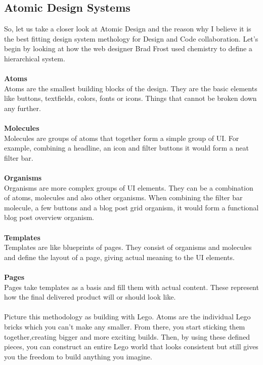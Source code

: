 \newpage
\subsection{Atomic Design Systems} %
So, let us take a closer look at Atomic Design and the reason why I believe it is the best fitting
design system methology for Design and Code collaboration. Let's begin by looking at how the web
designer Brad Frost used chemistry to define a hierarchical system. \\\\
\textbf{Atoms} \\
Atoms are the smallest building blocks of the design. They are the basic elements like buttons,
textfields, colors, fonts or icons. Things that cannot be broken down any further. \\\\
\textbf{Molecules} \\
Molecules are groups of atoms that together form a simple group of UI. For example, combining
a headline, an icon and filter buttons it would form a neat filter bar. \\\\
\textbf{Organisms} \\
Organisms are more complex groups of UI elements. They can be a combination of atoms, molecules and
also other organisms. When combining the filter bar molecule, a few buttons and a blog post grid
organism, it would form a functional blog post overview organism. \\\\
\textbf{Templates} \\
Templates are like blueprints of pages. They consist of organisms and molecules and define the
layout of a page, giving actual meaning to the UI elements. \\\\
\textbf{Pages}\\
Pages take templates as a basis and fill them with actual content. These represent how the final
delivered product will or should look like. \\
\\

Picture this methodology as building with Lego. Atoms are the individual Lego bricks
which you can't make any smaller. From there, you start sticking them together,creating bigger and
more exciting builds. Then, by using these defined pieces, you can construct an entire Lego world
that looks consistent but still gives you the freedom to build anything you imagine.

